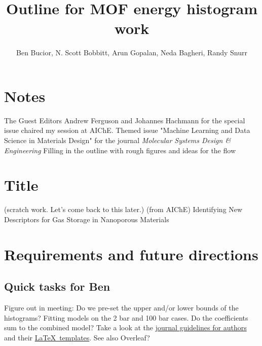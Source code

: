 \documentclass[letterpaper]{article}
\title{Outline for MOF energy histogram work}
\author{Ben Bucior, N. Scott Bobbitt, Arun Gopalan, Neda Bagheri, Randy Snurr}
\begin{document}
\maketitle

%

\section{Notes}
\begin{outline}
	\1 The Guest Editors Andrew Ferguson and Johannes Hachmann for the special issue chaired my session at AIChE.
	\1 Themed issue "Machine Learning and Data Science in Materials Design" for the journal \textit{Molecular Systems Design \& Engineering}
	\1 Filling in the outline with rough figures and ideas for the flow
\end{outline}


\section{Title}
\begin{outline}
	\1 (scratch work.  Let's come back to this later.)
	\1 (from AIChE) Identifying New Descriptors for Gas Storage in Nanoporous Materials
\end{outline}

\section{Requirements and future directions}

\subsection{Quick tasks for Ben}
\begin{outline}
	\1 Figure out in meeting: Do we pre-set the upper and/or lower bounds of the histograms?
	\1 Fitting models on the 2 bar and 100 bar cases.  Do the coefficients sum to the combined model?
	\1 Take a look at the \href{http://www.rsc.org/journals-books-databases/about-journals/molecular-systems-design-engineering/#undefined}{journal guidelines for authors} and their \href{http://www.rsc.org/journals-books-databases/journal-authors-reviewers/author-tools-services/#article-templates}{\LaTeX~templates}.  See also Overleaf?
\end{outline}
\end{document}
